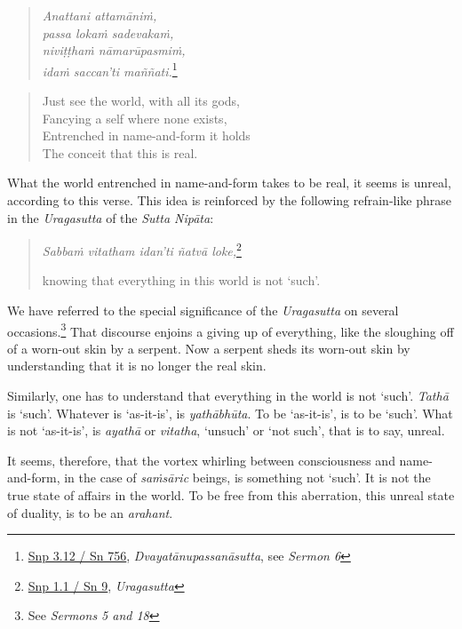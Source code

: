 \begin{quote}
\emph{Anattani attamāniṁ,}\\
\emph{passa lokaṁ sadevakaṁ,}\\
\emph{niviṭṭhaṁ nāmarūpasmiṁ,}\\
\emph{idaṁ saccan'ti maññati.}\footnote{\href{https://suttacentral.net/snp3.12/pli/ms}{Snp 3.12 / Sn 756}, \emph{Dvayatānupassanāsutta}, see \emph{Sermon 6}}
\end{quote}

\begin{quote}
Just see the world, with all its gods,\\
Fancying a self where none exists,\\
Entrenched in name-and-form it holds\\
The conceit that this is real.
\end{quote}

What the world entrenched in name-and-form takes to be real, it seems is unreal, according to this verse. This idea is reinforced by the following refrain-like phrase in the \emph{Uragasutta} of the \emph{Sutta Nipāta}:

\begin{quote}
\emph{Sabbaṁ vitatham idan'ti ñatvā loke,}\footnote{\href{https://suttacentral.net/snp1.1/pli/ms}{Snp 1.1 / Sn 9}, \emph{Uragasutta}}

knowing that everything in this world is not `such'.
\end{quote}

We have referred to the special significance of the \emph{Uragasutta} on several occasions.\footnote{See \emph{Sermons 5 and 18}} That discourse enjoins a giving up of everything, like the sloughing off of a worn-out skin by a serpent. Now a serpent sheds its worn-out skin by understanding that it is no longer the real skin.

Similarly, one has to understand that everything in the world is not `such'. \emph{Tathā} is `such'. Whatever is `as-it-is', is \emph{yathābhūta}. To be `as-it-is', is to be `such'. What is not `as-it-is', is \emph{ayathā} or \emph{vitatha}, `unsuch' or `not such', that is to say, unreal.

It seems, therefore, that the vortex whirling between consciousness and name-and-form, in the case of \emph{saṁsāric} beings, is something not `such'. It is not the true state of affairs in the world. To be free from this aberration, this unreal state of duality, is to be an \emph{arahant}.

